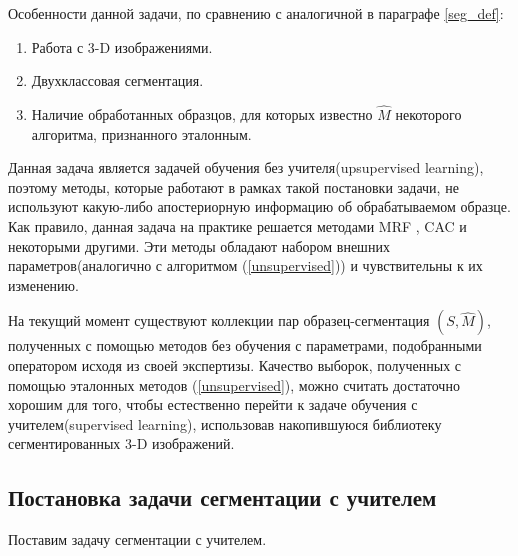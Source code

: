 \documentclass[12pt, a4paper]{extarticle}
\makeatletter
\newcommand{\problemtitle}[1]{\gdef\@problemtitle{#1}}%
\newcommand{\probleminput}[1]{\gdef\@probleminput{#1}}%
\newcommand{\problemquestion}[1]{\gdef\@problemquestion{#1}}%
\makeatother
\begin{document}
Особенности данной задачи, по сравнению с аналогичной в параграфе \ref{seg_def}:
\begin{enumerate}
	\item Работа с 3-D изображениями.
	
	\item Двухклассовая сегментация.

	\item Наличие обработанных образцов, для которых известно 
	$\hat{M}$ некоторого алгоритма, признанного эталонным.	
\end{enumerate}

Данная задача является задачей обучения без учителя(upsupervised learning), поэтому методы, которые работают в рамках такой постановки задачи, не используют какую-либо апостериорную информацию об обрабатываемом образце.
Как правило, данная задача на практике решается методами MRF \cite{14}, CAC \cite{12} и некоторыми другими. Эти методы обладают набором внешних параметров(аналогично с алгоритмом (\ref{unsupervised})) и чувствительны к их изменению.

На текущий момент существуют коллекции пар образец-сегментация 
$(S, \hat{M})$, полученных с помощью методов без обучения с параметрами, подобранными оператором исходя из своей экспертизы. Качество выборок, полученных с помощью эталонных методов (\ref{unsupervised}), можно считать достаточно хорошим для того, чтобы естественно перейти к задаче обучения с учителем(supervised learning), использовав накопившуюся библиотеку сегментированных 3-D изображений. 

\newpage

\subsection{Постановка задачи сегментации с учителем} \label{seg_supervised}

Поставим задачу сегментации с учителем.

\begin{problem}
  \problemtitle{\textbf{Задача обучения с учителем}}
  \probleminput{пространство объектов $X$ и пространтсво ответов $Y$ Между ними существует соответствие(функция) $f: X \rightarrow Y$, множество примеров отображения $f: \{(X_1,\ Y_1),\ ... ,\ (X_N,\ Y_N) \},\ f(X_i) = Y_i ,\ i = \overline{1, N}$, дано параметрическое семейство функций $f_{\theta}: X \rightarrow Y.$}
  \problemquestion{наилучшим образом приблизить соответствие $f$ на  всём пространтстве $X$ с помощью параметрического семества функций $f_{\theta}$, используя данное множестве примеров отображения. 
}
\end{problem}
\end{document}
